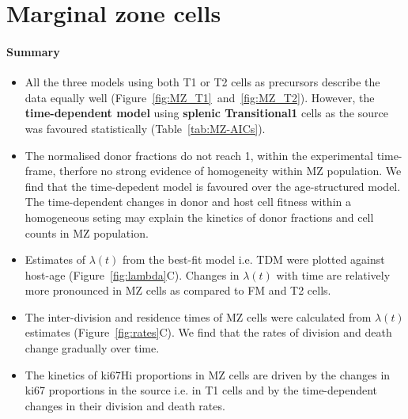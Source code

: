 \documentclass[11pt]{article}
\begin{document}
\clearpage


\section*{Marginal zone cells}

\paragraph{Summary}
\begin{itemize}
	\item All the three models using both T1 or T2 cells as precursors describe the data equally well (Figure~\ref{fig:MZ_T1}~and~\ref{fig:MZ_T2}).
	However, the \textbf{time-dependent model} using \textbf{splenic Transitional1} cells as the source was favoured statistically (Table~\ref{tab:MZ-AICs}).
	
	\item The normalised donor fractions do not reach 1, within the experimental time-frame, therfore no strong evidence of homogeneity within MZ population.
	We find that the time-depedent model is favoured over the age-structured model.
	The time-dependent changes in donor and host cell fitness within a homogeneous seting may explain the kinetics of donor fractions and cell counts in MZ population.
	
	\item Estimates of $\lambda(t)$ from the best-fit model i.e. TDM were plotted against host-age (Figure~\ref{fig:lambda}C). 
	Changes in $\lambda(t)$ with time are relatively more pronounced in MZ cells as compared to FM and T2 cells.
	
	\item The inter-division and residence times of MZ cells were calculated from $\lambda(t)$ estimates (Figure~\ref{fig:rates}C). We find that the rates of division and death change gradually over time.
	
	\item The kinetics of ki67Hi proportions in MZ cells are driven by the changes in ki67 proportions in the source i.e. in T1 cells and by the time-dependent changes in their division and death rates.
	
\end{itemize}
\end{document}
